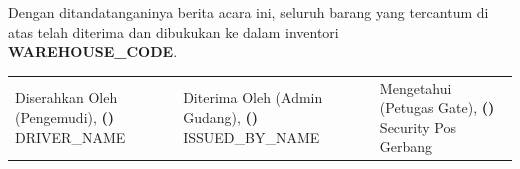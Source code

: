 \documentclass[11pt,a4paper]{article}
\begin{document}
\vspace{0.3cm}
\noindent
Dengan ditandatanganinya berita acara ini, seluruh barang yang tercantum di atas telah diterima dan dibukukan ke dalam inventori \textbf{{{WAREHOUSE_CODE}}}.

\vspace{1.1cm}
\noindent
\begin{tabularx}{\textwidth}{@{} X X X @{}}
  \centering
  Diserahkan Oleh (Pengemudi), \vspace{1.7cm} \newline
  \textbf{(\underline{\hspace{3.8cm}})} \newline
  {\small {{DRIVER_NAME}}} &
  \centering
  Diterima Oleh (Admin Gudang), \vspace{1.7cm} \newline
  \textbf{(\underline{\hspace{3.8cm}})} \newline
  {\small {{ISSUED_BY_NAME}}} &
  \centering
  Mengetahui (Petugas Gate), \vspace{1.7cm} \newline
  \textbf{(\underline{\hspace{3.8cm}})} \newline
  {\small Security Pos Gerbang}
\end{tabularx}
\end{document}
